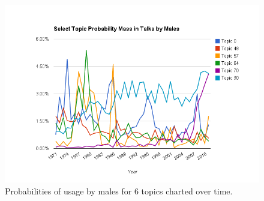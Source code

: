 \begin{figure}[center]
	\centering
	\includegraphics[width=16cm]{images/ToT(males).png}
	\caption{Probabilities of usage by males for 6 topics charted over time.}
	\label{fig:top-5-topics-ranges-male}
\end{figure}


\clearpage


%





